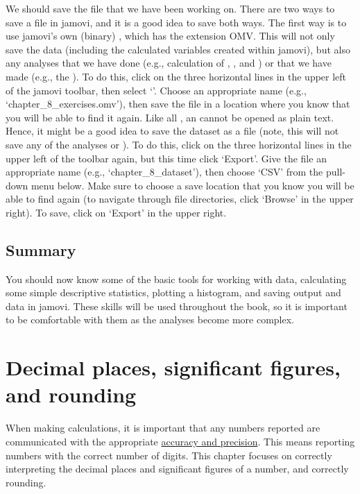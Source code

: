 \documentclass[
  openany]{krantz}
\begin{document}
\newpage

We should save the file that we have been working on.
There are two ways to save a file in jamovi, and it is a good idea to save both ways.
The first way is to use jamovi's own (binary) , which has the extension OMV.
This will not only save the data (including the calculated variables created within jamovi), but also any analyses that we have done (e.g., calculation of , , and ) or  that we have made (e.g., the ).
To do this, click on the three horizontal lines in the upper left of the jamovi toolbar, then select `'.
Choose an appropriate name (e.g., `chapter\_8\_exercises.omv'), then save the file in a location where you know that you will be able to find it again.
Like all , an  cannot be opened as plain text.
Hence, it might be a good idea to save the dataset as a  file (note, this will not save any of the analyses or ).
To do this, click on the three horizontal lines in the upper left of the toolbar again, but this time click `Export'.
Give the file an appropriate name (e.g., `chapter\_8\_dataset'), then choose `CSV' from the pull-down menu below.
Make sure to choose a save location that you know you will be able to find again (to navigate through file directories, click `Browse' in the upper right).
To save, click on `Export' in the upper right.

\hypertarget{summary-1}{%
\section{Summary}\label{summary-1}}

You should now know some of the basic tools for working with data, calculating some simple descriptive statistics, plotting a histogram, and saving output and data in jamovi.
These skills will be used throughout the book, so it is important to be comfortable with them as the analyses become more complex.

\hypertarget{Chapter_9}{%
\chapter{Decimal places, significant figures, and rounding}\label{Chapter_9}}

When making calculations, it is important that any numbers reported are communicated with the appropriate \protect\hyperlink{Chapter_6}{accuracy and precision}.
This means reporting numbers with the correct number of digits.
This chapter focuses on correctly interpreting the decimal places and significant figures of a number, and correctly rounding.
\end{document}
